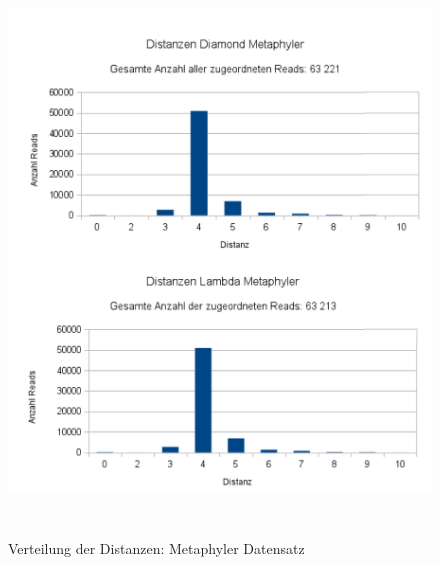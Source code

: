 \documentclass[10pt, a4paper]{article}[08.12.2015]
\begin{document}
     \begin{figure}[H]
      \centering
      \noindent\includegraphics[width=\linewidth,height=15cm,
      keepaspectratio]{Abbildungen/Metaphyler_Distanzen_both.png}
      \caption{Verteilung der Distanzen: Metaphyler Datensatz}
    \end{figure}
\end{document}
